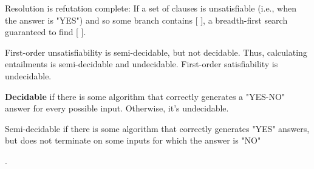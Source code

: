 \documentclass[7pt,landscape]{article}
\begin{document}
\begin{multicols}{2}
Resolution is refutation complete: If a set of clauses is unsatisfiable (i.e., when the answer is "YES") and so some branch contains [ ], a breadth-first search guaranteed to find [ ].

First-order unsatisfiability is semi-decidable, but not decidable. Thus, calculating entailments is semi-decidable and undecidable. First-order satisfiability is undecidable.

\textbf{Decidable} if there is some algorithm that correctly generates a "YES-NO" answer for every possible input. Otherwise, it’s undecidable.

Semi-decidable if there is some algorithm that correctly generates "YES" answers, but
does not terminate on some inputs for which the answer is "NO"

\vspace{350px}

.


\end{multicols}
\end{document}
